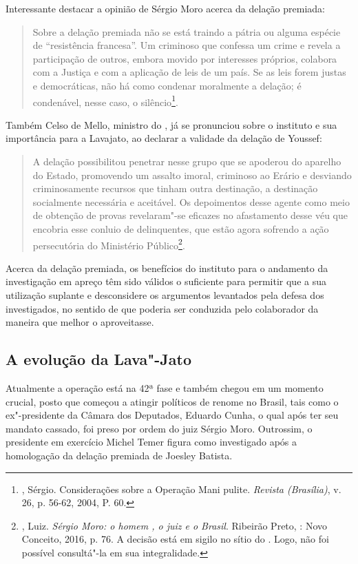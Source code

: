 Interessante destacar a opinião de Sérgio Moro acerca da delação
premiada:

\begin{quote}
Sobre a delação premiada não se está traindo a pátria ou alguma espécie
de ``resistência francesa''. Um criminoso que confessa um crime e revela a
participação de outros, embora movido por interesses próprios, colabora
com a Justiça e com a aplicação de leis de um país. Se as leis forem
justas e democráticas, não há como condenar moralmente a delação; é
condenável, nesse caso, o silêncio\footnote{, Sérgio. Considerações
  sobre a Operação Mani pulite. \emph{Revista  (Brasília)}, v. 26,
  p. 56-62, 2004, P. 60.}.
\end{quote}

Também Celso de Mello, ministro do , já se pronunciou sobre o
instituto e sua importância para a Lavajato, ao declarar a validade da
delação de Youssef:

\begin{quote}
A delação possibilitou penetrar nesse grupo que se apoderou do aparelho
do Estado, promovendo um assalto imoral, criminoso ao Erário e desviando
criminosamente recursos que tinham outra destinação, a destinação
socialmente necessária e aceitável. Os depoimentos desse agente como
meio de obtenção de provas revelaram"-se eficazes no afastamento desse
véu que encobria esse conluio de delinquentes, que estão agora sofrendo a
ação persecutória do Ministério Público\footnote{, Luiz.
  \emph{Sérgio Moro: o homem , o juiz e o Brasil}. Ribeirão Preto, :
  Novo Conceito, 2016, p. 76. A decisão está em sigilo no sítio
  do . Logo, não foi possível consultá"-la em sua integralidade.}.
\end{quote}

Acerca da delação premiada, os benefícios do instituto para o andamento
da investigação em apreço têm sido válidos o suficiente para permitir
que a sua utilização suplante e desconsidere os argumentos levantados
pela defesa dos investigados, no sentido de que poderia ser conduzida
pelo colaborador da maneira que melhor o aproveitasse.

\subsection{A evolução da Lava"-Jato}

Atualmente a operação está na 42ª fase e também chegou em um momento
crucial, posto que começou a atingir políticos de renome no Brasil, tais
como o ex"-presidente da Câmara dos Deputados, Eduardo Cunha, o qual após
ter seu mandato cassado, foi preso por ordem do juiz Sérgio Moro.
Outrossim, o presidente em exercício Michel Temer figura como
investigado após a homologação da delação premiada de Joesley Batista.

